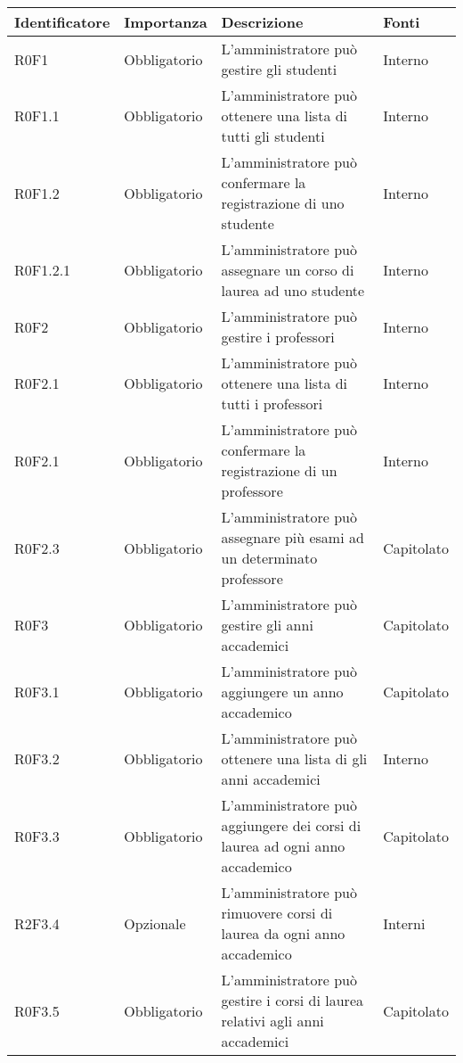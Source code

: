\documentclass[AnalisiDeiRequisiti.tex]{subfiles}
\begin{document}
\label{table:Tabella requisiti funzionali}
\begin{longtable}[H]{|p{2.5cm}|p{2.5cm}|p{5cm}|p{2cm}|}
	\hline
	\rowcolor[HTML]{38FFF8} 
	\textbf{Identificatore} & \textbf{Importanza} & \textbf{Descrizione} & \textbf{Fonti} \\ \hline
	\endhead
	R0F1 & Obbligatorio & L'amministratore può gestire gli studenti & Interno \\ \hline
	R0F1.1 & Obbligatorio & L'amministratore può ottenere una lista di tutti gli studenti & Interno \\ \hline
	R0F1.2 & Obbligatorio & L'amministratore può confermare la registrazione di uno studente & Interno \\ \hline
	R0F1.2.1 & Obbligatorio & L'amministratore può assegnare un corso di laurea ad uno studente & Interno \\ \hline
	R0F2 & Obbligatorio & L'amministratore può gestire i professori & Interno \\ \hline
	R0F2.1 & Obbligatorio & L'amministratore può ottenere una lista di tutti i professori & Interno \\ \hline
	R0F2.1 & Obbligatorio & L'amministratore può confermare la registrazione di un professore & Interno \\ \hline
	R0F2.3 & Obbligatorio & L'amministratore può assegnare più esami ad un determinato professore & Capitolato \\ \hline
	R0F3 & Obbligatorio & L'amministratore può gestire gli anni accademici & Capitolato \\ \hline
	R0F3.1 & Obbligatorio & L'amministratore può aggiungere un anno accademico & Capitolato \\ \hline
	R0F3.2 & Obbligatorio & L'amministratore può ottenere una lista di gli anni accademici & Interno \\ \hline
	R0F3.3 & Obbligatorio & L'amministratore può aggiungere dei corsi di laurea ad ogni anno accademico & Capitolato \\ \hline
	R2F3.4 & Opzionale & L'amministratore può rimuovere corsi di laurea da ogni anno accademico & Interni \\ \hline
	R0F3.5 & Obbligatorio & L'amministratore può gestire i corsi di laurea relativi agli anni accademici & Capitolato \\ \hline

\end{longtable}
\end{document}
